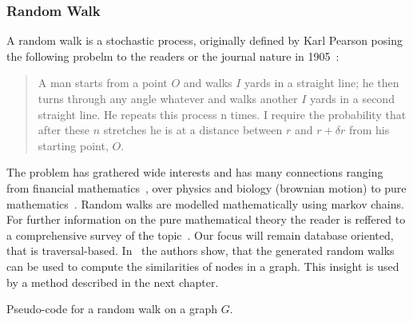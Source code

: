             \subsubsection*{Random Walk}\label{rand-w}
                A random walk is a stochastic process, originally defined by Karl Pearson posing the following probelm to the readers or the journal nature in 1905~\autocite{pearson1905problem}: 
                \begin{quote}
                    A man starts from a point $O$ and walks $I$ yards in a straight line; he then turns through any angle whatever and walks another $I$ yards in a second straight line. 
                    He repeats this process n times. 
                    I require the probability that after these $n$ stretches he is at a distance between $r$ and $r + \delta r$ from his starting point, $O$.
                \end{quote}
                The problem has grathered wide interests and has many connections ranging from financial mathematics~\autocite{bachelier1900theorie}, over physics and biology (brownian motion\autocite{brown1828xxvii}) to pure mathematics~\autocite{wiener1976collected}. 
                Random walks are modelled mathematically using markov chains.            
                For further information on the pure mathematical theory the reader is reffered to a comprehensive survey of the topic~\autocite{lovasz1993random}. 
                Our focus will remain database oriented, that is traversal-based.
                In~\autocite{fouss2007random} the authors show, that the generated random walks can be used to compute the similarities of nodes in a graph. 
                This insight is used by a method described in the next chapter.
                
                \begin{algorithm}[htp]
                    \hrulealg
                \caption{Pseudo-code for a random walk on a graph $G$.}\label{random_walk}
                \end{algorithm}
                
